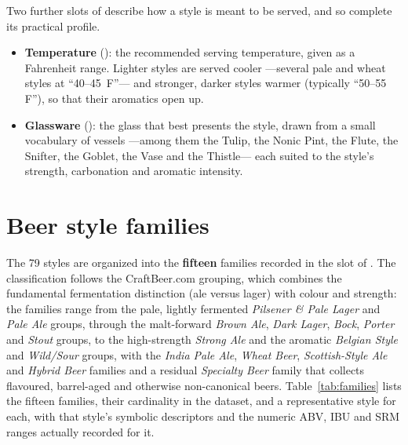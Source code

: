 Two further slots of  describe how a style is meant to be
served, and so complete its practical profile.

\begin{itemize}[leftmargin=2em]
  \item \textbf{Temperature} (): the recommended serving
        temperature, given as a Fahrenheit range. Lighter styles are served
        cooler ---several pale and wheat styles at ``40--45\,\textdegree
        F''--- and stronger, darker styles warmer (typically ``50--55\,\textdegree
        F''), so that their aromatics open up.
  \item \textbf{Glassware} (): the glass that best presents the style,
        drawn from a small vocabulary of vessels ---among them the Tulip, the
        Nonic Pint, the Flute, the Snifter, the Goblet, the Vase and the
        Thistle--- each suited to the style's strength, carbonation and aromatic
        intensity.
\end{itemize}

\section{Beer style families}

The 79 styles are organized into the \textbf{fifteen} families recorded in the
 slot of . The classification follows the
CraftBeer.com grouping, which combines the fundamental fermentation distinction
(ale versus lager) with colour and strength: the families range from the pale,
lightly fermented \emph{Pilsener \& Pale Lager} and \emph{Pale Ale} groups,
through the malt-forward \emph{Brown Ale}, \emph{Dark Lager}, \emph{Bock},
\emph{Porter} and \emph{Stout} groups, to the high-strength \emph{Strong Ale} and
the aromatic \emph{Belgian Style} and \emph{Wild/Sour} groups, with the
\emph{India Pale Ale}, \emph{Wheat Beer}, \emph{Scottish-Style Ale} and
\emph{Hybrid Beer} families and a residual \emph{Specialty Beer} family that
collects flavoured, barrel-aged and otherwise non-canonical beers.
Table~\ref{tab:families} lists the fifteen families, their cardinality in the
dataset, and a representative style for each, with that style's symbolic
descriptors and the numeric ABV, IBU and SRM ranges actually recorded for it.

